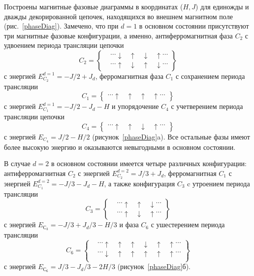 Построены магнитные фазовые диаграммы в координатах ($H, J$) для  единожды и дважды декорированной цепочек, находящихся во внешнем магнитном поле (рис.~\ref{phaseDiag}). Замечено, что при $d=1$  в основном состоянии присутствуют три магнитные фазовые конфигурации, а именно, антиферромагнитная фаза $C_2$ с удвоением периода трансляции цепочки 
\begin{equation*}
C_2 =
\left\{\!\begin{aligned}
&\dots \downarrow\;\;\; \uparrow \;\;\;\downarrow \;\;\; \uparrow   \dots\\[1ex]
& \dots \uparrow\;\;\; \downarrow \;\;\;\uparrow \;\;\; \downarrow  \dots
\end{aligned}\right\}
\end{equation*}
с энергией $E_{C_2}^{d=1} = -J/2+J_{d}$, ферромагнитная фаза $C_1$ с сохранением периода трансляции
\begin{equation*}
C_1 =
\left\{\!\begin{aligned}
\dots \uparrow\;\;\; \uparrow \;\;\;\uparrow \;\;\; \uparrow  \dots
\end{aligned}\right\}
\end{equation*}
с энергией $E_{C_1}^{d=1} = -J/2-J_d-H$ и упорядочение $C_4$ с учетверением периода трансляции цепочки 
\begin{equation*}
C_4 =
\left\{\!\begin{aligned}
\dots \uparrow\;\;\; \uparrow \;\;\;\downarrow \;\;\; \uparrow   \dots 
\end{aligned}\right\}
\end{equation*}
с энергией $E_{C_4} = J/2-H/2$ (рисунок~\ref{phaseDiag}a). Все остальные фазы имеют более высокую энергию и оказываются невыгодными в основном состоянии. 

В случае $d=2$ в основном состоянии имеется четыре различных конфигурации: антиферромагнитная $C_2$ с энергией $E_{C_2}^{d=2} = J/3+J_{d}$, ферромагнитная $C_1$ с энергией $E_{C_1}^{d=2} = -J/3-J_d-H$, а также конфигурация $C_3$ c утроением периода трансляции
\begin{equation*}
C_3 =
\left\{\!\begin{aligned}
&\dots \uparrow\;\;\; \uparrow \;\;\;\downarrow   \dots \\[1ex]
&\dots \uparrow\;\;\; \downarrow \;\;\;\uparrow   \dots 
\end{aligned}\right\}
\end{equation*}
с энергией $E_{С_3} = -J/3+J_d/3-H/3$ и фаза $C_6$ с ушестерением периода трансляции
\begin{equation*}
C_6 =
\left\{\!\begin{aligned}
&\dots \uparrow\;\;\; \uparrow \;\;\;\uparrow\;\;\; \downarrow\;\;\; \uparrow \;\;\;\uparrow    \dots \\[1ex]
&\dots \downarrow\;\;\; \uparrow \;\;\;\uparrow\;\;\; \uparrow\;\;\; \uparrow \;\;\;\uparrow    \dots \\[1ex] 
\end{aligned}\right\}
\end{equation*}
с энергией $E_{С_6} = J/3-J_d/3-2H/3$ (рисунок~\ref{phaseDiag}б).

